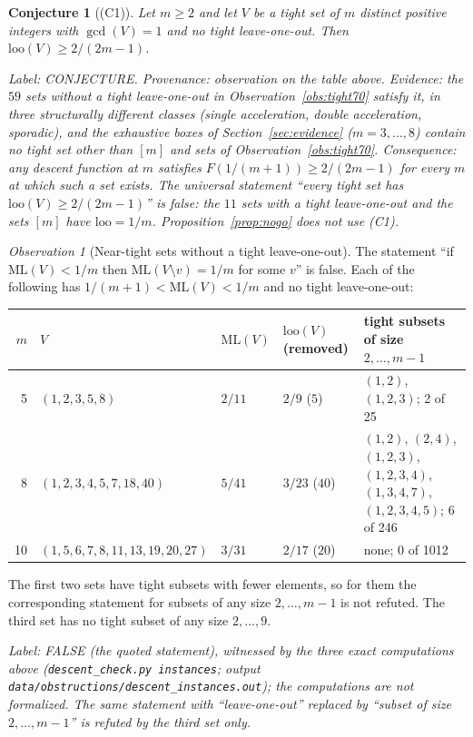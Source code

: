 \documentclass[11pt]{article}
\newtheorem{conjecture}[theorem]{Conjecture}
\theoremstyle{remark}
\newtheorem{observation}[theorem]{Observation}
\newcommand{\ML}{\mathrm{ML}}
\newcommand{\loo}{\mathrm{loo}}
\newcommand{\lab}[1]{\par\smallskip\noindent\textit{Label: #1.}}
\begin{document}
\begin{conjecture}[(C1)]\label{conj:C1}
Let $m\ge2$ and let $V$ be a tight set of $m$ distinct positive integers with $\gcd(V)=1$ and no tight leave-one-out. Then $\loo(V)\ge2/(2m-1)$.
\end{conjecture}
\lab{CONJECTURE. Provenance: observation on the table above. Evidence: the $59$ sets without a tight leave-one-out in Observation~\ref{obs:tight70} satisfy it, in three structurally different classes (single acceleration, double acceleration, sporadic), and the exhaustive boxes of Section~\ref{sec:evidence} ($m=3,\dots,8$) contain no tight set other than $[m]$ and sets of Observation~\ref{obs:tight70}. Consequence: any descent function at $m$ satisfies $F(1/(m+1))\ge2/(2m-1)$ for every $m$ at which such a set exists. The universal statement ``every tight set has $\loo(V)\ge2/(2m-1)$'' is false: the $11$ sets with a tight leave-one-out and the sets $[m]$ have $\loo=1/m$. Proposition~\ref{prop:nogo} does not use (C1)}

\begin{observation}[Near-tight sets without a tight leave-one-out]\label{obs:near}
The statement ``if $\ML(V)<1/m$ then $\ML(V\setminus v)=1/m$ for some $v$'' is false. Each of the following has $1/(m+1)<\ML(V)<1/m$ and no tight leave-one-out:
\begin{center}\scriptsize
\begin{tabular}{@{}rp{4.0cm}llp{4.6cm}@{}}
\toprule
$m$ & $V$ & $\ML(V)$ & $\loo(V)$ (removed) & tight subsets of size $2,\dots,m-1$\\
\midrule
5 & $(1,2,3,5,8)$ & $2/11$ & $2/9$ ($5$) & $(1,2)$, $(1,2,3)$; 2 of 25\\
8 & $(1,2,3,4,5,7,18,40)$ & $5/41$ & $3/23$ ($40$) & $(1,2)$, $(2,4)$, $(1,2,3)$, $(1,2,3,4)$, $(1,3,4,7)$, $(1,2,3,4,5)$; 6 of 246\\
10 & $(1,5,6,7,8,11,13,19,20,27)$ & $3/31$ & $2/17$ ($20$) & none; 0 of 1012\\
\bottomrule
\end{tabular}
\end{center}
The first two sets have tight subsets with fewer elements, so for them the corresponding statement for subsets of any size $2,\dots,m-1$ is not refuted. The third set has no tight subset of any size $2,\dots,9$.
\end{observation}
\lab{FALSE (the quoted statement), witnessed by the three exact computations above (\texttt{descent\_check.py instances}; output \texttt{data/obstructions/descent\_instances.out}); the computations are not formalized. The same statement with ``leave-one-out'' replaced by ``subset of size $2,\dots,m-1$'' is refuted by the third set only}
\end{document}
